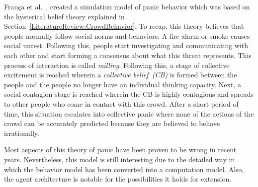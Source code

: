 Fran{\c c}a et al.~\cite{Franca:2009wq}, created a simulation model of panic behavior which was based on the hysterical belief theory explained in Section~\ref{LiteratureReview:CrowdBehavior}. To recap, this theory believes that people normally follow social norms and behaviors. A fire alarm or smoke causes social unrest. Following this, people start investigating and communicating with each other and start forming a consensus about what this threat represents. This process of interaction is called \emph{milling}. Following this, a stage of collective excitement is reached wherein a \emph{collective belief~(CB)} is formed between the people and the people no longer have an individual thinking capacity. Next, a social contagion stage is reached wherein the CB is highly contagious and spreads to other people who come in contact with this crowd. After a short period of time, this situation escalates into collective panic where none of the actions of the crowd can be accurately predicted because they are believed to behave irrationally.

Most aspects of this theory of panic have been proven to be wrong in recent years. Nevertheless, this model is still interesting due to the detailed way in which the behavior model has been converted into a computation model. Also, the agent architecture is notable for the possibilities it holds for extension.

